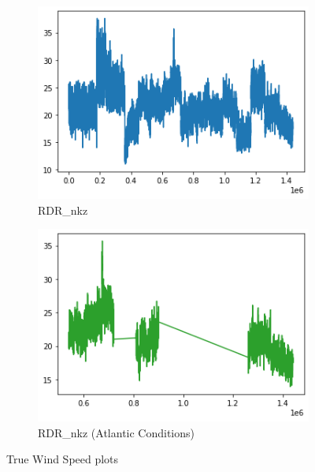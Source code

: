\begin{figure}[h]
     \centering
     \begin{subfigure}[t]{0.49\textwidth}
         \centering
         \includegraphics[width=\textwidth]{figures/distributions/RDR-TWS.png}
         \caption{RDR\_nkz}
     \end{subfigure}
     \hfill
     \begin{subfigure}[t]{0.49\textwidth}
         \centering
         \includegraphics[width=\textwidth]{figures/distributions/RDR-atlantic-TWS.png}
         \caption{RDR\_nkz (Atlantic Conditions)}
     \end{subfigure}
        \label{fig:rdr-tws}
        \caption{True Wind Speed plots}
\end{figure}

\clearpage
